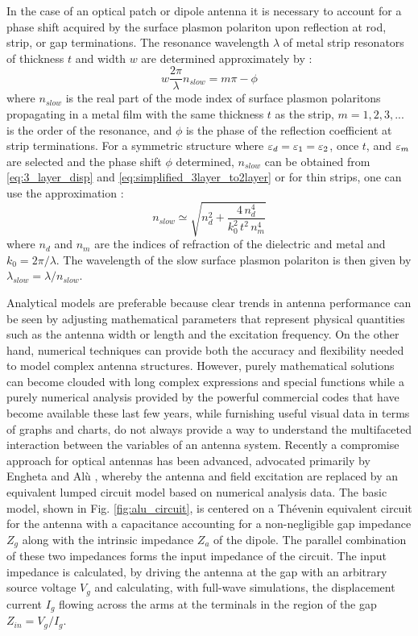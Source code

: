 \documentclass[11pt]{article}
\begin{document}
In the case of an optical patch or dipole antenna it is necessary to account for a phase shift acquired by the surface plasmon polariton upon reflection at rod, strip, or gap terminations. The resonance wavelength $\lambda$ of metal strip resonators of thickness $t$ and width $w$ are determined approximately by \cite{Sondergaard2007}:
%
\begin{equation}
  w \frac{2 \pi}{\lambda} n_{slow} = m\pi  - \phi
  \label{eq:resonant_lambda}
\end{equation}
%
where $n_{slow}$ is the real part of the mode index of surface plasmon polaritons propagating in a metal film with the same thickness $t$ as the strip, $m = 1,2,3,...$ is the order of the resonance, and $\phi$ is the phase of the reflection coefficient at strip terminations. For a symmetric structure where $\varepsilon_d = \varepsilon_1 = \varepsilon_2$, once $t$, and $\varepsilon_m$ are selected and the phase shift $\phi$ determined, $n_{slow}$ can be obtained from \eqref{eq:3_layer_disp} and \eqref{eq:simplified_3layer_to2layer} or for thin strips, one can use the approximation \cite{Sondergaard2008}:
%
\begin{equation}
  n_{slow} \simeq \sqrt {n_d^2 + \frac{4 \, n_d^4}{k_0^2 \, t^2 \, n_m^4}}
  \label{eq:n_approx}
\end{equation}
%
where $n_d$ and $n_m$ are the indices of refraction of the dielectric and metal and $k_0 = 2 \pi /\lambda$. The wavelength of the slow surface plasmon polariton is then given by $\lambda_{slow} = \lambda/ n_{slow}$.

Analytical models are preferable because clear trends in antenna performance can be seen by adjusting mathematical parameters that represent physical quantities such as the antenna width or length and the excitation frequency. On the other hand, numerical techniques can provide both the accuracy and flexibility needed to model complex antenna structures. However, purely mathematical solutions can become clouded with long complex expressions and special functions while a purely numerical analysis provided by the powerful commercial codes that have become available these last few years, while furnishing useful visual data in terms of graphs and charts, do not always provide a way to understand the multifaceted interaction between the variables of an antenna system. Recently a compromise approach for optical antennas has been advanced, advocated primarily by Engheta and Alù \cite{Engheta2005,Alu2007,Zhao2011,9781107014145}, whereby the antenna and field excitation are replaced by an equivalent lumped circuit model based on
numerical analysis data. The basic model, shown in Fig. \ref{fig:alu_circuit}, is centered on a Thévenin equivalent circuit for the antenna with a capacitance accounting for a non-negligible gap
impedance $Z_g$ along with the intrinsic impedance $Z_a$ of the dipole. The parallel combination of these two impedances forms the input impedance of the circuit. The input impedance is calculated, by driving the antenna at the gap with an arbitrary source voltage $V_g$ and calculating, with full-wave simulations, the displacement current $I_g$ flowing across the arms at the terminals in the region of the gap $Z_{in} = V_g / I_g$.
\end{document}
